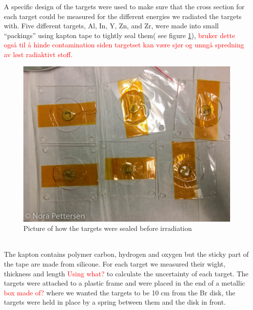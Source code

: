 \documentclass[twoside,english]{uiofysmaster/uiofysmaster}
\begin{document}
A specific design of the targets were used to make sure that the cross section for each target could be measured for the different energies we radiated the targets with. Five different targets, Al, In, Y, Zn, and Zr, were made into small “packings” using kapton tape to tightly seal them( see figure \ref{fig:target_design}), \textcolor{red}{ bruker dette også til å hinde contamination siden targetset kan være sjør og unngå spredning av løst radiaktivt stoff. }
\begin{figure} [h]
   \centering
   \includegraphics[scale=.2]{packs-1.JPG}
   \caption{Picture of how the targets were sealed before irradiation}
   \label{fig:target_design}
\end{figure}
\\
\noindent
The kapton contains polymer carbon, hydrogen and oxygen but the sticky part of the tape are made from silicone. For each target we measured their wight, thickness and length \textcolor{red}{Using what?} to calculate the uncertainty of each target. The targets were attached to a plastic frame and were placed in the end of a metallic \textcolor{red}{box made of?} where we wanted the targets to be 10 cm from the Br disk, the targets were held in place by a spring between them and the disk in front. 
\end{document}
